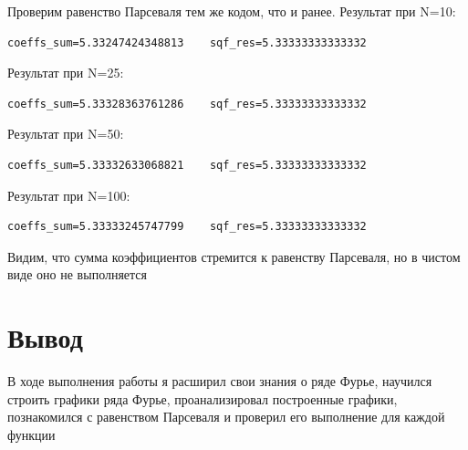 \documentclass[a4paper, 16pt]{article}
\begin{document}
\newpage
\noindent Проверим равенство Парсеваля тем же кодом, что и ранее. Результат при N=10:
\begin{lstlisting}
coeffs_sum=5.33247424348813    sqf_res=5.33333333333332
\end{lstlisting}


\noindent Результат при N=25:
\begin{lstlisting}
coeffs_sum=5.33328363761286    sqf_res=5.33333333333332
\end{lstlisting}


\noindent Результат при N=50:
\begin{lstlisting}
coeffs_sum=5.33332633068821    sqf_res=5.33333333333332
\end{lstlisting}


\noindent Результат при N=100:
\begin{lstlisting}
coeffs_sum=5.33333245747799    sqf_res=5.33333333333332
\end{lstlisting}


\noindent Видим, что сумма коэффициентов стремится к равенству Парсеваля, но в чистом
виде оно не выполняется


\section{Вывод}
\noindent В ходе выполнения работы я расширил свои знания о ряде Фурье, научился
строить графики ряда Фурье, проанализировал построенные графики,
познакомился с равенством Парсеваля и проверил его выполнение для каждой функции
\end{document}
